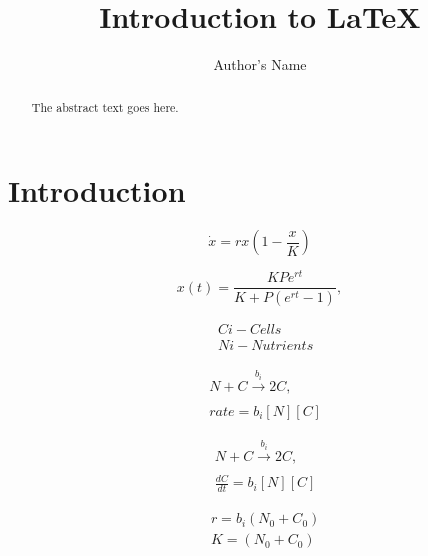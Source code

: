 \documentclass{article}
\begin{document}
\title{Introduction to \LaTeX{}}
\author{Author's Name}

\maketitle

\begin{abstract}
The abstract text goes here.
\end{abstract}

\section{Introduction}


\begin{equation}
\label{eq:1}
\dot{x} = rx\left(1 - \frac{x}{K}\right)
\end{equation}

\begin{equation}
\label{eq:2}
x(t) = \frac{KPe^{rt}}{K + P(e^{rt}-1)},
\end{equation}

\begin{subequations}
	\begin{align}
	&C{i} - Cells\\
	&N{i} - Nutrients
	\end{align}
\end{subequations}

\begin{subequations}
	\label{eq:9}
	\begin{align}
		&N + C \xrightarrow[]{b_{i}} 2C,\\
		&rate = b_{i}[N][C]
	\end{align}
\end{subequations}

\begin{subequations}
	\label{eq:9}
	\begin{align}
	&N + C \xrightarrow[]{b_{i}} 2C,\\
	&\frac{dC}{dt} = b_{i}[N][C]
	\end{align}
\end{subequations}

\begin{subequations}
	\label{eq:9}
	\begin{align}
	&r = b_{i}(N_0 + C_0)\\
	&K = (N_0 + C_0)
	\end{align}
\end{subequations}
\end{document}
